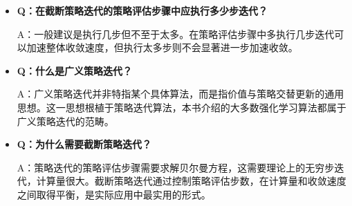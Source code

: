 \documentclass[UTF8]{article}
\begin{document}
\begin{itemize}
    \item \textbf{Q：在截断策略迭代的策略评估步骤中应执行多少步迭代？}

    A：一般建议是执行几步但不至于太多。在策略评估步骤中多执行几步迭代可以加速整体收敛速度，但执行太多步则不会显著进一步加速收敛。

    \item \textbf{Q：什么是广义策略迭代？}

    A：广义策略迭代并非特指某个具体算法，而是指价值与策略交替更新的通用思想。这一思想根植于策略迭代算法，本书介绍的大多数强化学习算法都属于广义策略迭代的范畴。

    \item \textbf{Q：为什么需要截断策略迭代？}

    A：策略迭代的策略评估步骤需要求解贝尔曼方程，这需要理论上的无穷步迭代，计算量很大。截断策略迭代通过控制策略评估步数，在计算量和收敛速度之间取得平衡，是实际应用中最实用的形式。
\end{itemize}
\end{document}
